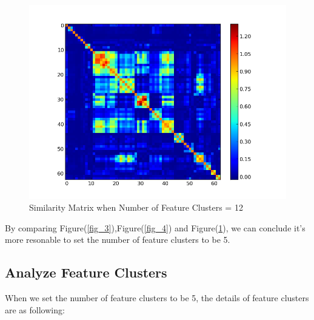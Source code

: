 \documentclass{article}
\begin{document}
\begin{figure}
\centering
	\includegraphics[width=1.\linewidth]{plt_n_clusters_f_12.png}
	\caption{Similarity Matrix when Number of Feature Clusters = 12}
	\label{fig_5}
\end{figure}
By comparing Figure(\ref{fig_3}),Figure(\ref{fig_4}) and Figure(\ref{fig_5}), we can conclude it's more resonable to set the number of feature clusters to be 5.

\subsection{Analyze Feature Clusters}
When we set the number of feature clusters to be 5, the details of feature clusters are as following:\\
\end{document}
